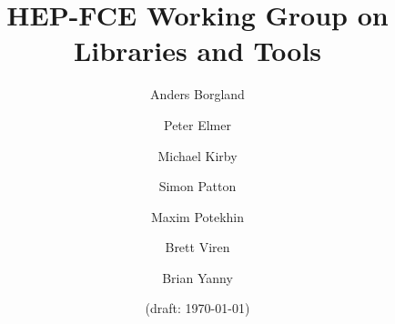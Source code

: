 \title{HEP-FCE Working Group on Libraries and Tools}

\author{Anders Borgland}

\author{Peter Elmer}

\author{Michael Kirby}

\author{Simon Patton}

\author{Maxim Potekhin}

\author{Brett Viren}

\author{Brian Yanny}


\date{(draft: \today)}          %
\maketitle


\tableofcontents
\pagebreak